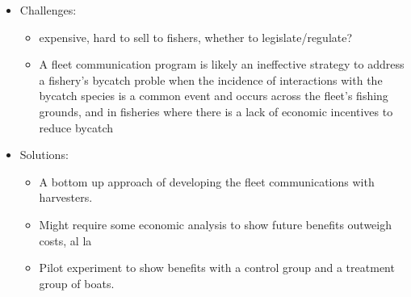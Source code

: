 \documentclass{article}
\begin{document}
\begin{itemize}
\begin{itemize}
\begin{itemize}
        \end{itemize}
      \item Challenges:
        \begin{itemize}
          \item expensive, hard to sell to fishers, whether to legislate/regulate?
          \item A fleet communication program is likely an ineffective strategy to address a fishery's bycatch proble when the incidence of interactions with the bycatch species is a common event and occurs across the fleet's fishing grounds, and in fisheries where there is a lack of economic incentives to reduce bycatch \citep{gilman2006fleet}
        \end{itemize}
      \item Solutions: 
        \begin{itemize}
          \item A bottom up approach of developing the fleet communications with harvesters. 
          \item Might require some economic analysis to show future benefits outweigh costs, al la \citet{gilman2006fleet}
          \item Pilot experiment to show benefits with a control group and a treatment group of boats.
        \end{itemize}


\end{itemize}
\end{itemize}
\end{document}
